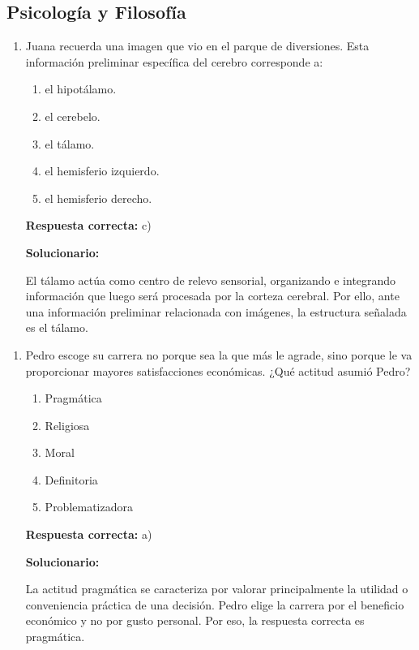 \subsection*{Psicología y Filosofía}

\begin{enumerate}[resume]
	
	\item Juana recuerda una imagen que vio en el parque de diversiones. Esta información preliminar específica del cerebro corresponde a:
	
	\begin{enumerate}[label=\alph*)]
		\item el hipotálamo.
		\item el cerebelo.
		\item el tálamo.
		\item el hemisferio izquierdo.
		\item el hemisferio derecho.
	\end{enumerate}
	
	\textbf{Respuesta correcta:} c)
	
	\vspace{2mm}
	\textbf{Solucionario:}
	
	El tálamo actúa como centro de relevo sensorial, organizando e integrando información que luego será procesada por la corteza cerebral. Por ello, ante una información preliminar relacionada con imágenes, la estructura señalada es el tálamo.
	
\end{enumerate}

\begin{enumerate}[resume]
	
	\item Pedro escoge su carrera no porque sea la que más le agrade, sino porque le va proporcionar mayores satisfacciones económicas. ¿Qué actitud asumió Pedro?
	
	\begin{enumerate}[label=\alph*)]
		\item Pragmática
		\item Religiosa
		\item Moral
		\item Definitoria
		\item Problematizadora
	\end{enumerate}
	
	\textbf{Respuesta correcta:} a)
	
	\vspace{2mm}
	\textbf{Solucionario:}
	
	La actitud pragmática se caracteriza por valorar principalmente la utilidad o conveniencia práctica de una decisión. Pedro elige la carrera por el beneficio económico y no por gusto personal. Por eso, la respuesta correcta es pragmática.
	
\end{enumerate}


